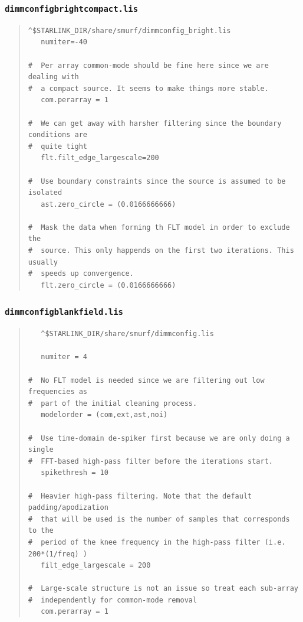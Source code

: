\documentclass[twoside,11pt]{article}
\renewcommand{\_}{\texttt{\symbol{95}}}
\newcommand{\file}[1]{\texttt{#1}}
\begin{document}
\subsubsection{\file{dimmconfig\_bright\_compact.lis}}
\begin{quote}
\begin{verbatim}
^$STARLINK_DIR/share/smurf/dimmconfig_bright.lis
   numiter=-40

#  Per array common-mode should be fine here since we are dealing with
#  a compact source. It seems to make things more stable.
   com.perarray = 1

#  We can get away with harsher filtering since the boundary conditions are
#  quite tight
   flt.filt_edge_largescale=200

#  Use boundary constraints since the source is assumed to be isolated
   ast.zero_circle = (0.0166666666)

#  Mask the data when forming th FLT model in order to exclude the
#  source. This only happends on the first two iterations. This usually
#  speeds up convergence.
   flt.zero_circle = (0.0166666666)

\end{verbatim}
\end{quote}

\subsubsection{\file{dimmconfig\_blank\_field.lis}}
\begin{quote}
\begin{verbatim}
   ^$STARLINK_DIR/share/smurf/dimmconfig.lis

   numiter = 4

#  No FLT model is needed since we are filtering out low frequencies as
#  part of the initial cleaning process.
   modelorder = (com,ext,ast,noi)

#  Use time-domain de-spiker first because we are only doing a single
#  FFT-based high-pass filter before the iterations start.
   spikethresh = 10

#  Heavier high-pass filtering. Note that the default padding/apodization
#  that will be used is the number of samples that corresponds to the
#  period of the knee frequency in the high-pass filter (i.e. 200*(1/freq) )
   filt_edge_largescale = 200

#  Large-scale structure is not an issue so treat each sub-array
#  independently for common-mode removal
   com.perarray = 1

\end{verbatim}
\end{quote}
\end{document}
